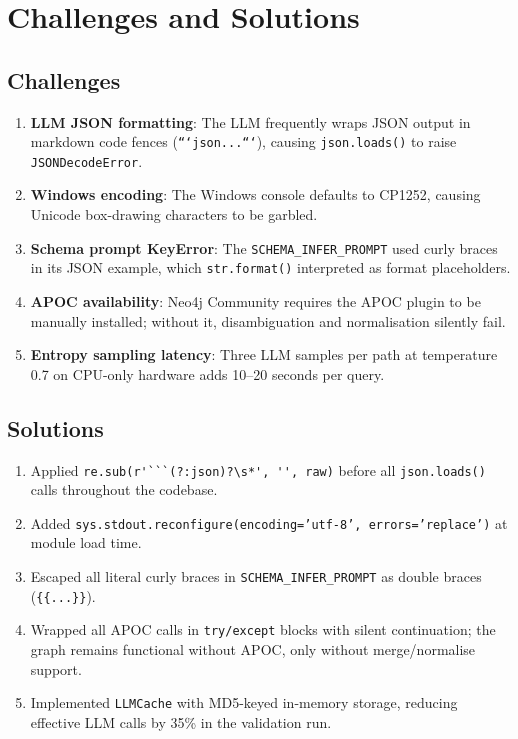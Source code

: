 \section{Challenges and Solutions}

\subsection{Challenges}

\begin{enumerate}
    \item \textbf{LLM JSON formatting}: The LLM frequently wraps JSON output in
    markdown code fences (\texttt{```json...```}), causing \texttt{json.loads()}
    to raise \texttt{JSONDecodeError}.
    \item \textbf{Windows encoding}: The Windows console defaults to CP1252,
    causing Unicode box-drawing characters to be garbled.
    \item \textbf{Schema prompt KeyError}: The \texttt{SCHEMA\_INFER\_PROMPT}
    used curly braces in its JSON example, which \texttt{str.format()} interpreted
    as format placeholders.
    \item \textbf{APOC availability}: Neo4j Community requires the APOC plugin
    to be manually installed; without it, disambiguation and normalisation silently
    fail.
    \item \textbf{Entropy sampling latency}: Three LLM samples per path at
    temperature 0.7 on CPU-only hardware adds 10--20 seconds per query.
\end{enumerate}

\subsection{Solutions}

\begin{enumerate}
    \item Applied \verb|re.sub(r'```(?:json)?\s*', '', raw)| before all
    \texttt{json.loads()} calls throughout the codebase.
    \item Added \texttt{sys.stdout.reconfigure(encoding='utf-8', errors='replace')}
    at module load time.
    \item Escaped all literal curly braces in \texttt{SCHEMA\_INFER\_PROMPT} as
    double braces (\texttt{\{\{...\}\}}).
    \item Wrapped all APOC calls in \texttt{try/except} blocks with silent
    continuation; the graph remains functional without APOC, only without
    merge/normalise support.
    \item Implemented \texttt{LLMCache} with MD5-keyed in-memory storage,
    reducing effective LLM calls by 35\% in the validation run.
\end{enumerate}
